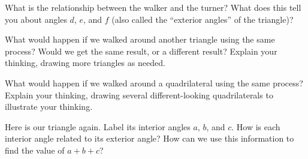 \documentclass[nooutcomes, noauthor]{ximera}
\begin{document}
\newpage

\begin{problem}
What is the relationship between the walker and the turner? What does this tell you about angles $d$, $e$, and $f$ (also called the ``exterior angles'' of the triangle)?
\end{problem}



\begin{problem}
What would happen if we walked around another triangle using the same process? Would we get the same result, or a different result? Explain your thinking, drawing more triangles as needed.
\end{problem}


\begin{problem}
What would happen if we walked around a quadrilateral using the same process? Explain your thinking, drawing several different-looking quadrilaterals to illustrate your thinking.
\end{problem}






\begin{problem}
Here is our triangle again. Label its interior angles $a$, $b$, and $c$. How is each interior angle related to its exterior angle? How can we use this information to find the value of $a +b + c$?


\begin{image}
\end{image}
\end{problem}





\pagebreak
\end{document}
